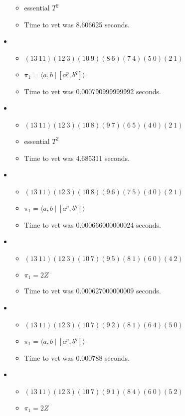 \documentclass{article}
\begin{document}
\begin{itemize}
\begin{itemize}
      \item essential $T^2$
      \item Time to vet was 8.606625 seconds.
\end{itemize}
\item \begin{itemize}
      \item $(13\ 11)(12\ 3)(10\ 9)(8\ 6)(7\ 4)(5\ 0)(2\ 1)$
      \item $\pi_1 = \langle a,b\ |\ [a^p,b^q]\rangle$
      \item Time to vet was 0.000790999999992 seconds.
\end{itemize}
\item \begin{itemize}
      \item $(13\ 11)(12\ 3)(10\ 8)(9\ 7)(6\ 5)(4\ 0)(2\ 1)$
      \item essential $T^2$
      \item Time to vet was 4.685311 seconds.
\end{itemize}
\item \begin{itemize}
      \item $(13\ 11)(12\ 3)(10\ 8)(9\ 6)(7\ 5)(4\ 0)(2\ 1)$
      \item $\pi_1 = \langle a,b\ |\ [a^p,b^q]\rangle$
      \item Time to vet was 0.000666000000024 seconds.
\end{itemize}
\item \begin{itemize}
      \item $(13\ 11)(12\ 3)(10\ 7)(9\ 5)(8\ 1)(6\ 0)(4\ 2)$
      \item $\pi_1 =2 Z$
      \item Time to vet was 0.000627000000009 seconds.
\end{itemize}
\item \begin{itemize}
      \item $(13\ 11)(12\ 3)(10\ 7)(9\ 2)(8\ 1)(6\ 4)(5\ 0)$
      \item $\pi_1 = \langle a,b\ |\ [a^p,b^q]\rangle$
      \item Time to vet was 0.000788 seconds.
\end{itemize}
\item \begin{itemize}
      \item $(13\ 11)(12\ 3)(10\ 7)(9\ 1)(8\ 4)(6\ 0)(5\ 2)$
      \item $\pi_1 =2 Z$

\end{itemize}
\end{itemize}
\end{document}

